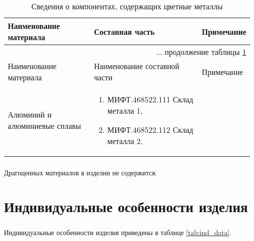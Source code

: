 {\small
\begin{longtable}{|p{6cm}|p{6cm}|p{4cm}|}

	\caption{\label{tab:cvetmet} Сведения о компонентах, содержащих цветные металлы} \\
			
			\hline
	 		Наименование материала & Составная часть &  Примечание  \\ 
	 		\hline
	 		\endfirsthead
	 		
	 		\multicolumn{3}{r}{... продолжение таблицы \ref{tab:cvetmet}}\\ %
	 		\hline
	 		Наименование материала & Наименование составной части &  Примечание  \\ 
	 		\hline
	 		\endhead
	 		
				Алюминий и алюминиевые сплавы 
				& 
				\vspace{-10mm}
				\begin{enumerate}[itemsep=0ex, leftmargin=0.6cm]
				\item МИФТ.468522.111 Склад металла 1,
				\item МИФТ.468522.112 Склад металла 2.
				\end{enumerate}   
				
				&  \\	
			\hline
\end{longtable}
}

\paragraph{} Драгоценных материалов в изделии не содержится.

	
\chapter{Индивидуальные особенности изделия}

\paragraph{} Индивидуальные особенности изделия приведены в таблице \ref{tab:ind_data}.



